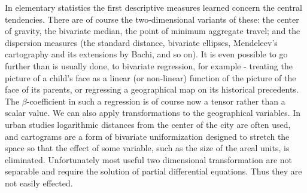 \documentclass[a4paper,11pt]{article}
\begin{document}
In elementary statistics the first descriptive measures learned concern the central tendencies. There are of course the two-dimensional variants of these: the center of gravity, the bivariate median, the point of minimum aggregate travel; and the dispersion measures (the standard distance, bivariate ellipses, Mendeleev's cartography and its extensions by Bachi, and so on). It is even possible to go further than is usually done, to bivariate regression, for example - treating the picture of a child's face as a linear (or non-linear) function of the picture of the face of its parents, or regressing a geographical map on its historical precedents. The $\beta$-coefficient in such a regression is of course now a tensor rather than a scalar value. We can also apply transformations to the geographical variables. In urban studies logarithmic distances from the center of the city are often used, and cartograms are a form of bivariate uniformization designed to stretch the space so that the effect of some variable, such as the size of the areal units, is eliminated. Unfortunately most useful two dimensional transformation are not separable and require the solution of partial differential equations. Thus they are not easily effected.

\smallskip
\end{document}
